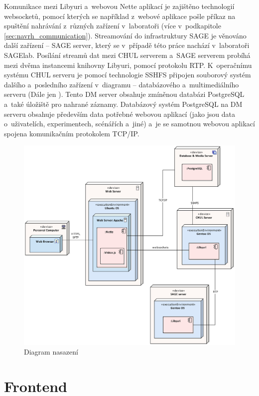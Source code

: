 \documentclass[thesis=M,czech]{FITthesis}[2012/06/26]
\begin{document}
Komunikace mezi Libyuri a~webovou Nette aplikací je zajištěno technologií websocketů, pomocí kterých se například z~webové aplikace pošle příkaz na spuštění nahrávání z~různých zařízení v~laboratoři (více v~podkapitole \ref{sec:navrh_communication}). Streamování do infrastruktury SAGE je věnováno další zařízení -- SAGE server, který se v~případě této práce nachází v~laboratoři SAGElab. Posílání streamů dat mezi CHUL serverem a~SAGE serverem probíhá mezi dvěma instancemi knihovny Libyuri, pomocí protokolu RTP. K~operačnímu systému CHUL serveru je pomocí technologie SSHFS připojen souborový systém dalšího a~posledního zařízení v~diagramu -- databázového a~multimediálního serveru (Dále jen ). Tento DM server obsahuje zmíněnou databázi PostgreSQL a~také úložiště pro nahrané záznamy. Databázový systém PostgreSQL na DM serveru obsahuje především data potřebné webovou aplikací (jako jsou data o~uživatelích, experimentech, scénářích a~jiné) a~je se samotnou webovou aplikací spojena komunikačním protokolem TCP/IP. 
\\
\begin{figure}[h]\centering
	\includegraphics[width=1\textwidth]{images/nasazeni_sage.eps}
	\caption{Diagram nasazení}\label{img:navrh_architektura_nasazeni}
\end{figure}


\section{Frontend} \label{sec:navrh_frontend}
\end{document}
